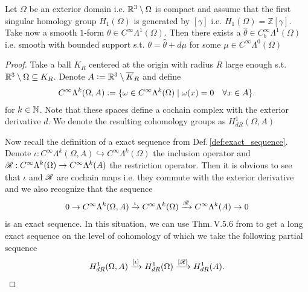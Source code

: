 \documentclass[../master_thesis.tex]{subfiles}
\begin{document}
\begin{lemma}\label{lem:1form_with_bounded_support_in_same_cohomology}
    Let $\Omega$ be an exterior domain i.e. $\mathbb{R}^3 \setminus \Omega$ is compact 
    and assume that the first singular homology 
    group $H_1(\Omega)$ is generated by $[\gamma]$ i.e. $H_1(\Omega) = \mathbb{Z} [\gamma]$.
    Take now a smooth $1$-form $\theta \in C^\infty \Lambda^1(\Omega)$.
    Then there exists a $\hat{\theta} \in C^\infty_b \Lambda^1(\Omega)$ i.e. smooth with 
    bounded support  
    s.t. $\theta = \hat{\theta} + d\mu$ for some $\mu \in C^\infty \Lambda^0(\Omega)$
\end{lemma}
\begin{proof}
    Take a ball $K_R$ centered at the origin with radius $R$ large enough s.t. 
    $\mathbb{R}^3 \setminus \Omega \subseteq K_R$. Denote 
    $A \vcentcolon= \mathbb{R}^3 \setminus \overline{K}_R$ and define 
    \begin{align*}
        C^\infty \Lambda^k(\Omega, A) 
        \vcentcolon= \{ \omega \in C^\infty \Lambda^k(\Omega) \mid \omega(x) = 0 \quad\forall x \in A \}.
    \end{align*}
    for $k \in \mathbb{N}$. Note that these spaces define a cochain complex with the exterior derivative $d$.
    We denote the resulting cohomology groups as $H^1_{dR}(\Omega,A)$

    Now recall the definition of a exact sequence from Def.\,\ref{def:exact_sequence}. Denote 
    $\iota: C^\infty \Lambda^k(\Omega, A) \hookrightarrow  C^\infty \Lambda^k(\Omega)$ the 
    inclusion operator and $\mathscr{R}: C^\infty \Lambda^k(\Omega) \rightarrow C^\infty \Lambda^k(A)$ 
    the restriction operator. Then it is obvious to see that 
    $\iota$ and $\mathscr{R}$ are cochain maps i.e. they commute with the exterior derivative and we also recognize that 
    the sequence 
    \begin{align*}
        0 \rightarrow C^\infty \Lambda^k(\Omega, A) \xrightarrow{\iota}
        C^\infty \Lambda^k(\Omega) \xrightarrow{\mathscr{R}} C^\infty \Lambda^k(A) \rightarrow 0
    \end{align*}
    is an exact sequence. In this situation, we can use Thm.\,V.5.6 from \cite{topology_and_geometry}
    to get a long exact sequence on the level of cohomology of which we take the following partial 
    sequence
    \begin{align*}
        H_{dR}^1(\Omega,A) \xrightarrow{[\iota]} H_{dR}^1(\Omega) \xrightarrow{[\mathscr{R}]} H_{dR}^1(A).
    \end{align*}


\end{proof}
\end{document}
